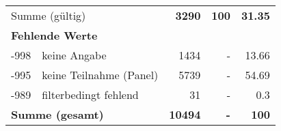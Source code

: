 \begin{longtable}{lXrrr}
     \midrule
     \multicolumn{2}{l}{Summe (gültig)} &
       \textbf{\num{3290}} &
     \textbf{\num{100}} &
       \textbf{\num[round-mode=places,round-precision=2]{31.35}} \\
     \multicolumn{5}{l}{\textbf{Fehlende Werte}}\\
       -998 &
       keine Angabe &
         \num{1434} &
        - &
         \num[round-mode=places,round-precision=2]{13.66} \\
       -995 &
       keine Teilnahme (Panel) &
         \num{5739} &
        - &
         \num[round-mode=places,round-precision=2]{54.69} \\
       -989 &
       filterbedingt fehlend &
         \num{31} &
        - &
         \num[round-mode=places,round-precision=2]{0.3} \\
     \midrule
     \multicolumn{2}{l}{\textbf{Summe (gesamt)}} &
          \textbf{\num{10494}} &
        \textbf{-} &
        \textbf{\num{100}} \\
     \bottomrule
     \end{longtable}
     
